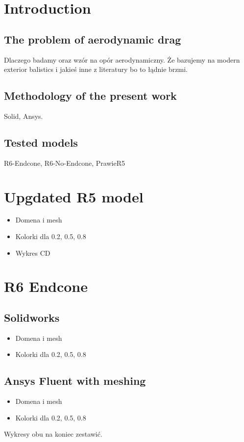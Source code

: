 \documentclass{article}
\begin{document}
\section{Introduction}
\subsection{The problem of aerodynamic drag}
Dlaczego badamy oraz wzór na opór aerodynamiczny. Że bazujemy na modern exterior balistics i jakieś inne z literatury bo to łądnie brzmi.

\subsection{Methodology of the present work}
Solid, Ansys.

\subsection{Tested models}
R6-Endcone, R6-No-Endcone, PrawieR5

\section{Upgdated R5 model}
\begin{itemize}
    \item Domena i mesh
    \item Kolorki dla 0.2, 0.5, 0.8
    \item Wykres CD
\end{itemize}

\section{R6 Endcone}
\subsection{Solidworks}
\begin{itemize}
    \item Domena i mesh
    \item Kolorki dla 0.2, 0.5, 0.8
\end{itemize}
\subsection{Ansys Fluent with meshing}
\begin{itemize}
    \item Domena i mesh
    \item Kolorki dla 0.2, 0.5, 0.8
\end{itemize}
Wykresy obu na koniec zestawić.
\end{document}
